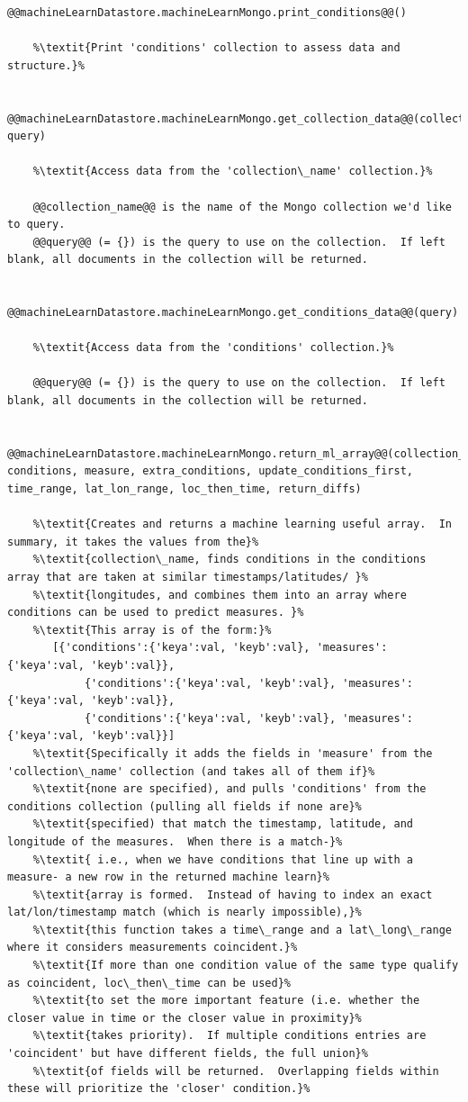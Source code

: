 \begin{lstlisting}[style=codedef]
@@machineLearnDatastore.machineLearnMongo.print_conditions@@()
	
	%\textit{Print 'conditions' collection to assess data and structure.}%


@@machineLearnDatastore.machineLearnMongo.get_collection_data@@(collection_name, query)
	
	%\textit{Access data from the 'collection\_name' collection.}%

	@@collection_name@@ is the name of the Mongo collection we'd like to query.
	@@query@@ (= {}) is the query to use on the collection.  If left blank, all documents in the collection will be returned.


@@machineLearnDatastore.machineLearnMongo.get_conditions_data@@(query)
	
	%\textit{Access data from the 'conditions' collection.}%

	@@query@@ (= {}) is the query to use on the collection.  If left blank, all documents in the collection will be returned.


@@machineLearnDatastore.machineLearnMongo.return_ml_array@@(collection_name, conditions, measure, extra_conditions, update_conditions_first, time_range, lat_lon_range, loc_then_time, return_diffs)
	
	%\textit{Creates and returns a machine learning useful array.  In summary, it takes the values from the}% 
	%\textit{collection\_name, finds conditions in the conditions array that are taken at similar timestamps/latitudes/ }% 	
	%\textit{longitudes, and combines them into an array where conditions can be used to predict measures. }%
	%\textit{This array is of the form:}%
	   [{'conditions':{'keya':val, 'keyb':val}, 'measures':{'keya':val, 'keyb':val}},
            {'conditions':{'keya':val, 'keyb':val}, 'measures':{'keya':val, 'keyb':val}},
            {'conditions':{'keya':val, 'keyb':val}, 'measures':{'keya':val, 'keyb':val}}]  
	%\textit{Specifically it adds the fields in 'measure' from the 'collection\_name' collection (and takes all of them if}%
	%\textit{none are specified), and pulls 'conditions' from the conditions collection (pulling all fields if none are}%
 	%\textit{specified) that match the timestamp, latitude, and longitude of the measures.  When there is a match-}%
	%\textit{ i.e., when we have conditions that line up with a measure- a new row in the returned machine learn}%
	%\textit{array is formed.  Instead of having to index an exact lat/lon/timestamp match (which is nearly impossible),}% 
	%\textit{this function takes a time\_range and a lat\_long\_range where it considers measurements coincident.}%
  	%\textit{If more than one condition value of the same type qualify as coincident, loc\_then\_time can be used}%
	%\textit{to set the more important feature (i.e. whether the closer value in time or the closer value in proximity}%
	%\textit{takes priority).  If multiple conditions entries are 'coincident' but have different fields, the full union}%
	%\textit{of fields will be returned.  Overlapping fields within these will prioritize the 'closer' condition.}% 


\end{lstlisting}
